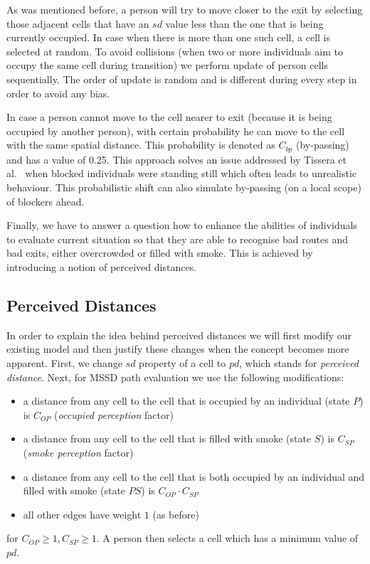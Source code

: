 As was mentioned before, a person will try to move closer to the exit by
selecting those adjacent cells that have an $sd$ value less than the one that
is being currently occupied.
In case when there is more than one such cell, a cell is selected at random.
To avoid collisions (when two or more individuals aim to occupy the same cell
during transition) we perform update of person cells sequentially.
The order of update is random and is different during every step in order to
avoid any bias.

In case a person cannot move to the cell nearer to exit (because it is being 
occupied by another person), with certain probability he can move to the
cell with the same spatial distance.
This probability is denoted as $C_{bp}$ (by-passing) and has a value
of 0.25.
This approach solves an issue addressed by Tissera et al.~\cite{Tissera1} when 
blocked individuals were standing still which often leads to unrealistic 
behaviour.
This probabilistic shift can also simulate by-passing (on a local scope) of
blockers ahead.

Finally, we have to answer a question how to enhance the abilities of
individuals to evaluate current situation so that they are able to recognise bad
routes and bad exits, either overcrowded or filled with smoke.
This is achieved by introducing a notion of perceived distances.

\subsection{Perceived Distances}
In order to explain the idea behind perceived distances we will first modify our 
existing model and then justify these changes when the concept becomes more
apparent. 
First, we change $sd$ property of a cell to $pd$, which stands for
\emph{perceived distance}.
Next, for MSSD path evaluation we use the following modifications:

\begin{itemize}
    \item a distance from any cell to the cell that is occupied by an
    individual (state $P$) is $C_{OP}$ (\emph{occupied perception} factor)
    \item a distance from any cell to the cell that is filled with smoke
    (state $S$) is $C_{SP}$ (\emph{smoke perception} factor)
    \item a distance from any cell to the cell that is both occupied by an
    individual and filled with smoke (state $PS$) is $C_{OP} \cdot C_{SP}$
    \item all other edges have weight $1$ (as before)
\end{itemize}
for $C_{OP} \geq 1, C_{SP} \geq 1$.
A person then selects a cell which has a minimum value of $pd$.

